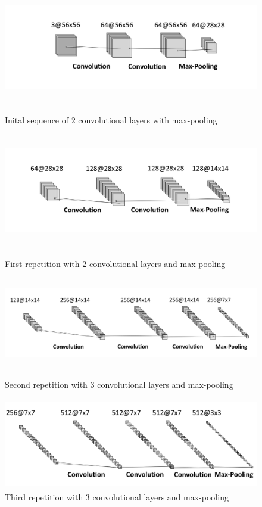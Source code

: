 \documentclass{tubaf-article}
\begin{document}
	\begin{figure}[htp]
		\centering
		\begin{minipage}{\textwidth}
			\centering
			\includegraphics[width=\textwidth, height=5cm]{final1.png}
			\caption{Inital sequence of 2 convolutional layers with max-pooling}
		\end{minipage}
		
		\begin{minipage}{\textwidth}
			\centering
			\includegraphics[width=\textwidth, height=5cm]{final2.png}
			\caption{First repetition with 2 convolutional layers and max-pooling}
		\end{minipage}
		
		\begin{minipage}{\textwidth}
			\centering
			\includegraphics[width=\textwidth, height=4cm]{final3.png}
			\caption{Second repetition with 3 convolutional layers and max-pooling}
		\end{minipage}
		
		\begin{minipage}{\textwidth}
			\centering
			\includegraphics[width=\textwidth, height=4cm]{final4.png}
			\caption{Third repetition with 3 convolutional layers and max-pooling}
		\end{minipage}
		
	\end{figure}
\end{document}
